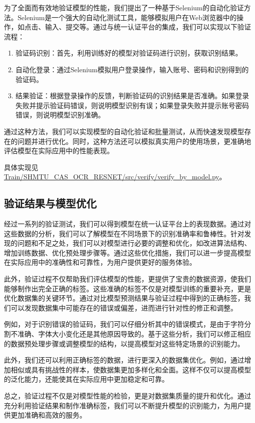 为了全面而有效地验证模型的性能，我们提出了一种基于Selenium的自动化验证方法。Selenium是一个强大的自动化测试工具，能够模拟用户在Web浏览器中的操作，如点击、输入、提交等。通过与统一认证平台的集成，我们可以实现以下验证流程：

\begin{enumerate}
	\item 验证码识别：首先，利用训练好的模型对验证码进行识别，获取识别结果。
	\item 自动化登录：通过Selenium模拟用户登录操作，输入账号、密码和识别得到的验证码。
	\item 结果验证：根据登录操作的反馈，判断验证码的识别结果是否准确。如果登录失败并提示验证码错误，则说明模型识别有误；如果登录失败并提示账号密码错误，则说明模型识别准确。
\end{enumerate}

通过这种方法，我们可以实现模型的自动化验证和批量测试，从而快速发现模型存在的问题并进行优化。同时，这种方法还可以模拟真实用户的使用场景，更准确地评估模型在实际应用中的性能表现。

具体实现见\url{Train/SHMTU_CAS_OCR_RESNET/src/verify/verify_by_model.py}。

\subsection{验证结果与模型优化}

经过一系列的验证测试，我们可以得到模型在统一认证平台上的表现数据。通过对这些数据的分析，我们可以了解模型在不同场景下的识别准确率和鲁棒性。针对发现的问题和不足之处，我们可以对模型进行必要的调整和优化，如改进算法结构、增加训练数据、优化预处理步骤等。通过这些优化措施，我们可以进一步提高模型在实际应用中的准确性和可靠性，为用户提供更好的服务体验。

此外，验证过程不仅帮助我们评估模型的性能，更提供了宝贵的数据资源，使我们能够制作出完全正确的标签。这些准确的标签不仅是对模型训练的重要补充，更是优化数据集的关键环节。通过对比模型预测结果与验证过程中得到的正确标签，我们可以发现数据集中可能存在的错误或偏差，进而进行针对性的修正和调整。

例如，对于识别错误的验证码，我们可以仔细分析其中的错误模式，是由于字符分割不准确、字体大小变化还是其他原因导致的。基于这些分析，我们可以修正相应的数据预处理步骤或调整模型的结构，以提高模型对这些特定场景的识别能力。

此外，我们还可以利用正确标签的数据，进行更深入的数据集优化。例如，通过增加相似或具有挑战性的样本，使数据集更加多样化和全面。这样不仅可以提高模型的泛化能力，还能使其在实际应用中更加稳定和可靠。

总之，验证过程不仅是对模型性能的检验，更是对数据集质量的提升和优化。通过充分利用验证结果和制作准确标签，我们可以不断提升模型的识别能力，为用户提供更加准确和高效的服务。
